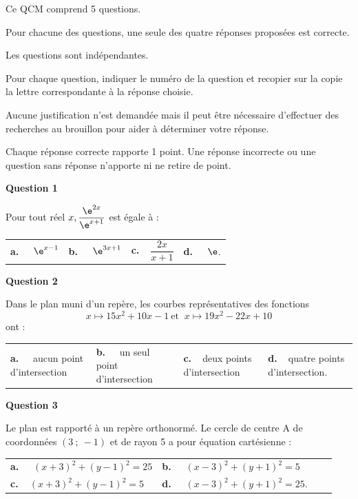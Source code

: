\medskip

Ce QCM comprend 5 questions. 

Pour chacune des questions, une seule des quatre réponses proposées est correcte. 

Les questions sont indépendantes.

Pour chaque question, indiquer le numéro de la question et recopier sur la copie la lettre correspondante à la réponse choisie.

Aucune justification n'est demandée mais il peut être nécessaire d'effectuer des recherches au brouillon pour aider à déterminer votre réponse.

Chaque réponse correcte rapporte 1 point. Une réponse incorrecte ou une question sans réponse n'apporte ni ne retire de point.

\medskip
\textbf{Question 1}
\medskip 

Pour tout réel $x,\dfrac{\e^{2x}}{\e^{x+1}}$ est égale à :

\medskip 
\begin{tabularx}{\linewidth}{*{4}{X}}
\textbf{a.~~} $\e^{x-1} $ &\textbf{b.~~} $\e^{3x+1} $&\textbf{c.~~}$\dfrac{2x}{x+1} $& \textbf{d.~~} $ \e $.
\end{tabularx}

\medskip
\textbf{Question 2}
\medskip 

Dans le plan muni d'un repère, les courbes représentatives des fonctions
\[x \mapsto 15x^2 + 10x - 1 \ \text{et  }\ x\mapsto  19x^2 - 22x + 10\] ont :

\medskip 
\begin{tabularx}{\linewidth}{*{4}{X}}
\textbf{a.~~}  aucun point
d'intersection &\textbf{b.~~} un seul point d'intersection &\textbf{c.~~}deux points d'intersection& \textbf{d.~~}quatre points
d'intersection.

\end{tabularx}

\medskip
\textbf{Question 3}
\medskip 

Le plan est rapporté à un repère orthonormé. Le cercle de centre A de
coordonnées $(3~;~- 1)$ et de rayon 5 a pour équation cartésienne :

\medskip 
\begin{tabularx}{\linewidth}{*{4}{X}}
\textbf{a.~~} $(x + 3)^2 + ( y - 1)^2 = 25$&\textbf{b.~~} $( x - 3)^2 + ( y + 1)^2 = 5 $\\\textbf{c.~~}$(x + 3)^2 + ( y - 1)^2 = 5 $& \textbf{d.~~} $( x - 3)^2 + ( y + 1)^2 = 25  $.
\end{tabularx}

